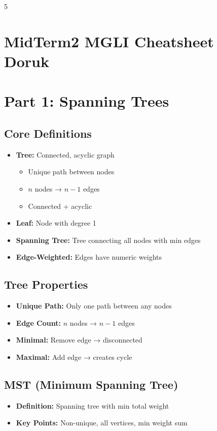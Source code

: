 \documentclass[a4paper,landscape]{article}
\begin{document}
\raggedright
\footnotesize
\begin{multicols*}{5}

\section*{MidTerm2 MGLI Cheatsheet Doruk}

\section*{Part 1: Spanning Trees}

\subsection*{Core Definitions}
\begin{itemize}[leftmargin=*, itemsep=0pt]
    \item \textbf{Tree:} Connected, acyclic graph
    \begin{itemize}[leftmargin=*, itemsep=0pt]
        \item Unique path between nodes
        \item $n$ nodes → $n-1$ edges
        \item Connected + acyclic
    \end{itemize}
    \item \textbf{Leaf:} Node with degree 1
    \item \textbf{Spanning Tree:} Tree connecting all nodes with min edges
    \item \textbf{Edge-Weighted:} Edges have numeric weights
\end{itemize}

\subsection*{Tree Properties}
\begin{itemize}[leftmargin=*, itemsep=0pt]
    \item \textbf{Unique Path:} Only one path between any nodes
    \item \textbf{Edge Count:} $n$ nodes → $n-1$ edges
    \item \textbf{Minimal:} Remove edge → disconnected
    \item \textbf{Maximal:} Add edge → creates cycle
\end{itemize}

\subsection*{MST (Minimum Spanning Tree)}
\begin{itemize}[leftmargin=*, itemsep=0pt]
    \item \textbf{Definition:} Spanning tree with min total weight
    \item \textbf{Key Points:} Non-unique, all vertices, min weight sum
\end{itemize}


\end{multicols*}
\end{document}
